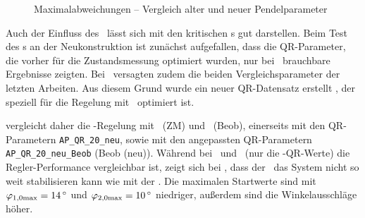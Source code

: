 \begin{figure}
	\caption{Maximalabweichungen -- Vergleich alter und neuer Pendelparameter}
	\label{fig:vglpendelpar}
\end{figure}

Auch der Einfluss des \beob\ lässt sich mit den kritischen \xots s gut darstellen.
Beim Test des \beob s an der Neukonstruktion ist zunächst aufgefallen, dass die QR-Parameter, die vorher für die Zustandsmessung optimiert wurden, nur bei \apz\ brauchbare Ergebnisse zeigten.
Bei \apv\ versagten zudem die beiden Vergleichsparameter der letzten Arbeiten.
Aus diesem Grund wurde ein neuer QR-Datensatz erstellt , der speziell für die Regelung mit \beob\ optimiert ist.

 vergleicht daher die \ap-Regelung mit \zm\ (ZM) und \beob\ (Beob), einerseits mit den QR-Parametern \texttt{AP\_QR\_20\_neu}, sowie mit den angepassten QR-Parametern \texttt{AP\_QR\_20\_neu\_Beob} (Beob (neu)).
Während bei \apz\ und \apd\ (nur die \beob-QR-Werte) die Regler-Performance vergleichbar ist, zeigt sich bei \apv, dass der \beob\ das System nicht so weit stabilisieren kann wie mit der \zm. 
Die maximalen Startwerte sind mit $\varphi_{1,0\mrm{max}}=\valdeg{14}$ und $\varphi_{2,0\mrm{max}}=\valdeg{10}$ niedriger, außerdem sind die Winkelausschläge höher.

